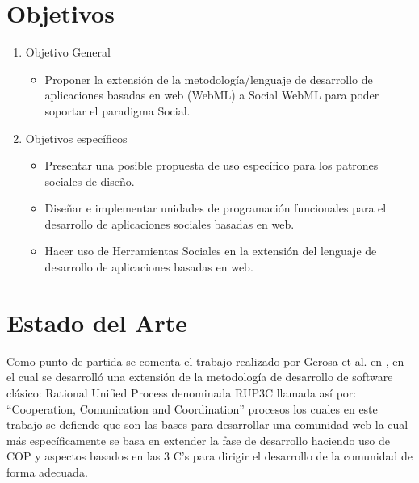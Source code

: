 \documentclass[oneside,12pt,a4paper]{memoir}%
\begin{document}
	\section{Objetivos}
	\label{sec:Objectives}
	\begin{enumerate}
	  \item Objetivo General
	  
	  \begin{itemize}
	    \item Proponer la extensi\'on de la metodolog\'ia/lenguaje de desarrollo de
	    aplicaciones basadas en web (\ac{WebML}) a Social WebML para poder soportar
	    el paradigma Social.
	  \end{itemize}
	  
	  \item Objetivos espec\'ificos
	  
	  \begin{itemize}
	    \item Presentar una posible propuesta de uso espec\'ifico para los patrones
	    sociales de dise\~no.
	    \item Dise\~nar e implementar unidades de programaci\'on funcionales para el
	    desarrollo de aplicaciones sociales basadas en web.
	    \item Hacer uso de Herramientas Sociales en la extensi\'on del lenguaje de
	    desarrollo de aplicaciones basadas en web.
	  \end{itemize}
	  
	\end{enumerate}
	
	\section{Estado del Arte}
	\label{sec:Status}
	Como punto de partida se comenta el trabajo realizado por Gerosa et
	al.	en \cite{Gerosa2005}, en el cual se desarroll\'o una extensi\'on de la
	metodolog\'ia de desarrollo de software cl\'asico:
	Rational Unified Process denominada RUP3C llamada as\'i por: ``Cooperation,
	Comunication and Coordination'' procesos los cuales en este trabajo se defiende
	que son las bases para desarrollar una comunidad web la cual m\'as
	espec\'ificamente se basa en extender la fase de desarrollo haciendo uso de
	\ac{COP} y aspectos basados en las $3$ C's para
	dirigir el desarrollo de la comunidad de forma adecuada.
	
\end{document}
